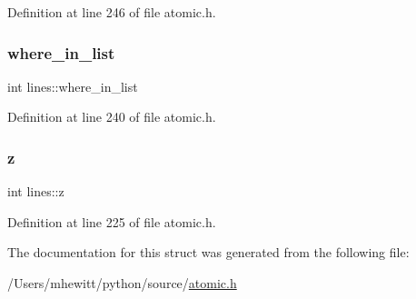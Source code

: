 Definition at line 246 of file atomic.\+h.

\mbox{\label{structlines_a21eb2458dc558a817e715ca184cf8bb5}} 
\subsubsection{\texorpdfstring{where\+\_\+in\+\_\+list}{where\_in\_list}}
{\footnotesize\ttfamily int lines\+::where\+\_\+in\+\_\+list}



Definition at line 240 of file atomic.\+h.

\mbox{\label{structlines_aef3b1049087e120d1cc1436ac78c62f6}} 
\subsubsection{\texorpdfstring{z}{z}}
{\footnotesize\ttfamily int lines\+::z}



Definition at line 225 of file atomic.\+h.



The documentation for this struct was generated from the following file\+:\begin{DoxyCompactItemize}
\item 
/\+Users/mhewitt/python/source/\hyperlink{atomic_8h}{atomic.\+h}\end{DoxyCompactItemize}
